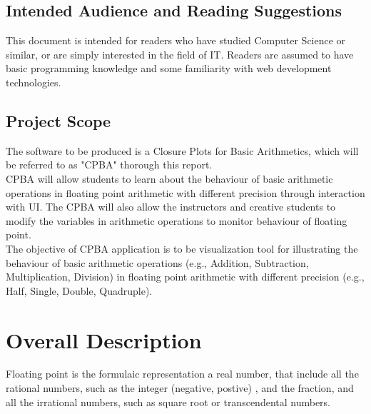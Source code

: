 \documentclass[11pt]{article}
\begin{document}
\subsection{Intended Audience and Reading Suggestions}
This document is intended for readers who have studied Computer Science or similar, or are simply interested in the field of IT. Readers are assumed to have basic programming knowledge and some familiarity with web development technologies.

\subsection{Project Scope}
The software to be produced is a Closure Plots for Basic Arithmetics, which will be referred to as "CPBA" thorough this report.\\

CPBA will allow students to learn about the behaviour of basic arithmetic operations in floating point arithmetic with different precision through interaction with UI. The CPBA will also allow the instructors and creative students to modify the variables in arithmetic operations to monitor behaviour of floating point.\\

The objective of CPBA application is to be visualization tool for illustrating the behaviour of basic arithmetic operations (e.g., Addition, Subtraction, Multiplication, Division) in floating point arithmetic with different precision (e.g., Half, Single, Double, Quadruple).\\





\section{Overall Description}%
Floating point is the formulaic representation a real number, that include all the rational numbers, such as the integer (negative, postive) , and the fraction, and all the irrational numbers, such as square root or  transcendental numbers.\\
\end{document}
